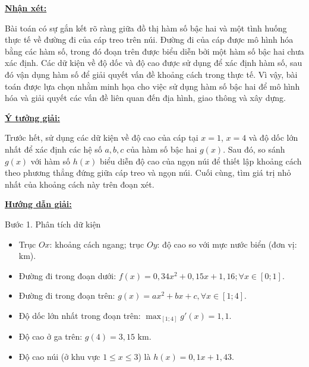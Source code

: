 \documentclass[12pt,a4paper,oneside]{book}
\theoremstyle{theorem}
\theoremstyle{definition}
\begin{document}
        \textbf{\underline{Nhận xét:}}
         
         Bài toán có sự gắn kết rõ ràng giữa đồ thị hàm số bậc hai và một tình huống thực tế về đường đi của cáp treo trên núi. Đường đi của cáp được mô hình hóa bằng các hàm số, trong đó đoạn trên được biểu diễn bởi một hàm số bậc hai chưa xác định. Các dữ kiện về độ dốc và độ cao được sử dụng để xác định hàm số, sau đó vận dụng hàm số để giải quyết vấn đề khoảng cách trong thực tế. Vì vậy, bài toán được lựa chọn nhằm minh họa cho việc sử dụng hàm số bậc hai để mô hình hóa và giải quyết các vấn đề liên quan đến địa hình, giao thông và xây dựng.
         
         \textbf{\underline{Ý tưởng giải:}}

        Trước hết, sử dụng các dữ kiện về độ cao của cáp tại \(x=1\), \(x=4\) và độ dốc lớn nhất để xác định các hệ số \(a,b,c\) của hàm số bậc hai \(g(x)\). Sau đó, so sánh \(g(x)\) với hàm số \(h(x)\) biểu diễn độ cao của ngọn núi để thiết lập khoảng cách theo phương thẳng đứng giữa cáp treo và ngọn núi. Cuối cùng, tìm giá trị nhỏ nhất của khoảng cách này trên đoạn xét.
        
         \textbf{\underline{Hướng dẫn giải:}}
            
            Bước 1. Phân tích dữ kiện
\begin{itemize}
    \item Trục $Ox$: khoảng cách ngang; trục $Oy$: độ cao so với mực nước biển (đơn vị: $\text{km}$).
    \item Đường đi trong đoạn dưới: $f(x) = 0,34x^2 + 0,15x + 1,16; \forall x \in [0; 1]$.
    \item Đường đi trong đoạn trên: $g(x) = ax^2 + bx + c, \forall x \in [1; 4]$.
    \item Độ dốc lớn nhất trong đoạn trên: $\max_{[1; 4]} g'(x) = 1,1$.
    \item Độ cao ở ga trên: $g(4) = 3,15 \text{ km}$.
    \item Độ cao núi (ở khu vực $1 \le x \le 3$) là $h(x) = 0,1x + 1,43$.
\end{itemize}
\end{document}
